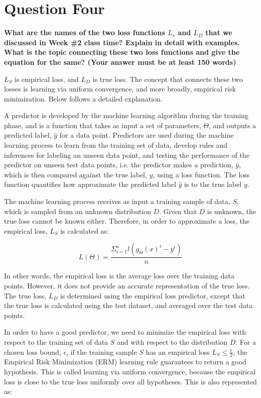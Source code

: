 \documentclass{article}
\begin{document}
\section{Question Four}
\noindent \textbf{What are the names of the two loss functions $L_s$ and $L_D$ that we discussed in Week \#2 class time? Explain in detail with examples. What is the topic connecting these two loss functions and give the equation for the same? (Your answer must be at least 150 words)}

$L_S$ is empirical loss, and $L_D$ is true loss. The concept that connects these two losses is learning via uniform convergence, and more broadly, empirical risk minimization. Below follows a detailed explanation.

A predictor is developed by the machine learning algorithm during the training phase, and is a function that takes as input a set of parameters, $\Theta$, and outputs a predicted label, $\hat{y}$ for a data point. Predictors are used during the machine learning process to learn from the training set of data, develop rules and inferences for labeling an unseen data point, and testing the performance of the predictor on unseen test data points, i.e. the predictor makes a prediction, $\hat{y}$, which is then compared against the true label, $y$, using a loss function. The loss function quantifies how approximate the predicted label $\hat{y}$ is to the true label $y$.

The machine learning process receives as input a training sample of data, $S$, which is sampled from an unknown distribution $D$. Given that $D$ is unknown, the true loss cannot be known either. Therefore, in order to approximate a loss, the empirical loss, $L_S$ is calculated as:

\begin{equation}
    L(\Theta) = \frac{\Sigma_{i=1}^{n} l(g_{\Theta}(x)^{i}-y^{i})}{n}
\end{equation}

In other words, the empirical loss is the average loss over the training data points. However, it does not provide an accurate representation of the true loss. The true loss, $L_D$ is determined using the empirical loss predictor, except that the true loss is calculated using the test dataset, and averaged over the test data points. 

In order to have a good predictor, we need to minimize the empirical loss with respect to the training set of data $S$ and with respect to the distribution $D$. For a chosen loss bound, $\epsilon$, if the training sample $S$ has an empirical loss $L_S \leq \frac{\epsilon}{2}$, the Empirical Risk Minimization (ERM) learning rule guarantees to return a good hypothesis. This is called learning via uniform convergence, because the empirical loss is close to the true loss uniformly over all hypotheses. This is also represented as:
\end{document}
